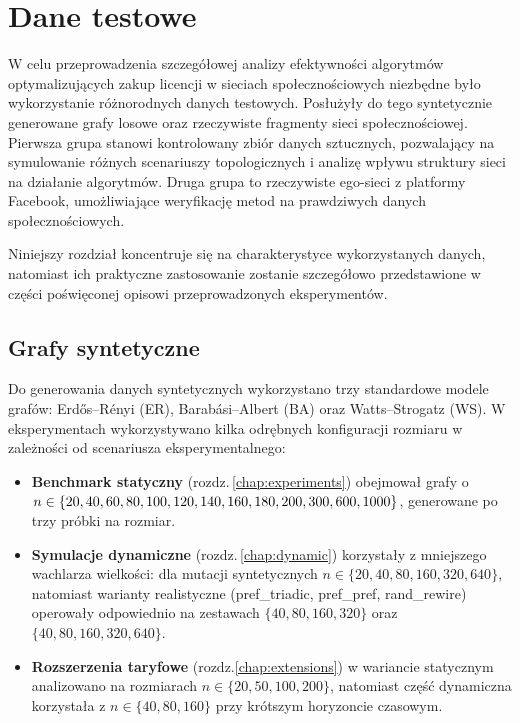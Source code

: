 \chapter{Dane testowe}\label{chap:testdata}
W celu przeprowadzenia szczegółowej analizy efektywności algorytmów optymalizujących zakup licencji w sieciach społecznościowych niezbędne było wykorzystanie różnorodnych danych testowych. Posłużyły do tego syntetycznie generowane grafy losowe oraz rzeczywiste fragmenty sieci społecznościowej. Pierwsza grupa stanowi kontrolowany zbiór danych sztucznych, pozwalający na symulowanie różnych scenariuszy topologicznych i analizę wpływu struktury sieci na działanie algorytmów. Druga grupa to rzeczywiste ego-sieci z platformy Facebook, umożliwiające weryfikację metod na prawdziwych danych społecznościowych.

Niniejszy rozdział koncentruje się na charakterystyce wykorzystanych danych, natomiast ich praktyczne zastosowanie zostanie szczegółowo przedstawione w części poświęconej opisowi przeprowadzonych eksperymentów.

\section{Grafy syntetyczne}

Do generowania danych syntetycznych wykorzystano trzy standardowe modele grafów: Erd\H{o}s--Rényi (ER), Barabási--Albert (BA) oraz Watts--Strogatz (WS).
W eksperymentach wykorzystywano kilka odrębnych konfiguracji rozmiaru w zależności od scenariusza eksperymentalnego:
\begin{itemize}
  \item \textbf{Benchmark statyczny} (rozdz.\,\ref{chap:experiments}) obejmował grafy o $n \in \{20, 40, 60, 80, 100, 120, 140, 160, 180,\\200, 300, 600, 1000\}$, generowane po trzy próbki na rozmiar.
  \item \textbf{Symulacje dynamiczne} (rozdz.\,\ref{chap:dynamic}) korzystały z mniejszego wachlarza wielkości: dla mutacji syntetycznych $n \in \{20, 40, 80, 160, 320, 640\}$, natomiast warianty realistyczne (pref\_triadic, pref\_pref, rand\_rewire) operowały odpowiednio na zestawach $\{40, 80, 160, 320\}$ oraz $\{40, 80, 160, 320, 640\}$.
  \item \textbf{Rozszerzenia taryfowe} (rozdz.\ref{chap:extensions}) w wariancie statycznym analizowano na rozmiarach $n \in \{20, 50, 100, 200\}$, natomiast część dynamiczna korzystała z $n \in \{40, 80, 160\}$ przy krótszym horyzoncie czasowym.
\end{itemize}


